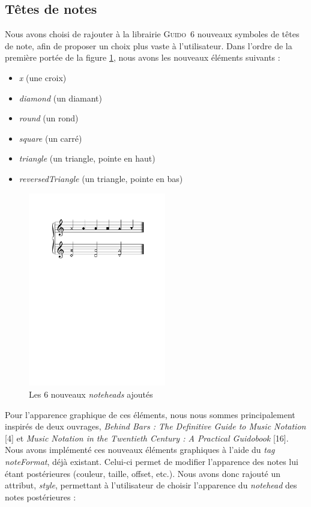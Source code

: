 \documentclass{article}
\newcommand{\guido}			{\textsc{Guido}}
\begin{document}
\subsection{Têtes de notes}\label{subsec:tetes_notes}
%
Nous avons choisi de rajouter à la librairie \guido\ 6 nouveaux symboles de têtes de note, afin de proposer un choix plus vaste à l'utilisateur. Dans l'ordre de la première portée de la figure \ref{fig:noteheads}, nous avons les nouveaux éléments suivants :
%
\begin{itemize}
    \item \emph{x} (une croix)
    \item \emph{diamond} (un diamant)
    \item \emph{round} (un rond)
    \item \emph{square} (un carré)
    \item \emph{triangle} (un triangle, pointe en haut)
    \item \emph{reversedTriangle} (un triangle, pointe en bas)
\end{itemize} 
\bigskip
%
\begin{figure}[h]
\centering
\includegraphics[width=6cm]{img/partitions/noteheads.pdf}
\caption{Les 6 nouveaux \emph{noteheads} ajoutés}
\label{fig:noteheads}
\end{figure}
%
Pour l'apparence graphique de ces éléments, nous nous sommes principalement inspirés de deux ouvrages, \emph{Behind Bars : The Definitive Guide to Music Notation} [4] et \emph{Music Notation in the Twentieth Century : A Practical Guidobook} [16].
%
Nous avons implémenté ces nouveaux éléments graphiques à l'aide du \emph{tag} \emph{noteFormat}, déjà existant. Celui-ci permet de modifier l'apparence des notes lui étant postérieures (couleur, taille, offset, etc.). Nous avons donc rajouté un attribut, \emph{style}, permettant à l'utilisateur de choisir l'apparence du \emph{notehead} des notes postérieures :
\end{document}
